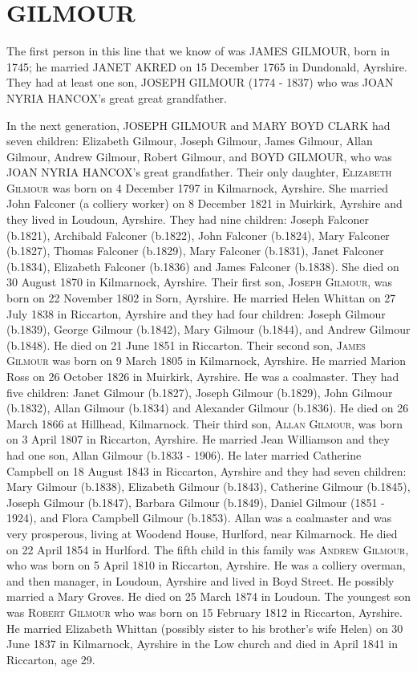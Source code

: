\section{GILMOUR}

The first person in this line that we know of was \uppercase{James Gilmour}, born in 1745;  he married \uppercase{Janet Akred} on 15 December 1765 in Dundonald, Ayrshire. They had at least one son, \uppercase{Joseph Gilmour} (1774 - 1837) who was \uppercase{Joan Nyria Hancox}'s great great grandfather.

In the next generation, \uppercase{Joseph Gilmour} and \uppercase{Mary Boyd Clark} had seven children: Elizabeth Gilmour, Joseph Gilmour, James Gilmour, Allan Gilmour, Andrew Gilmour, Robert Gilmour, and \uppercase{Boyd Gilmour}, who was \uppercase{Joan Nyria Hancox}'s great grandfather.
Their only daughter, \textsc{Elizabeth Gilmour} was born on 4 December 1797 in Kilmarnock, Ayrshire. She married John Falconer (a colliery worker) on 8 December 1821 in Muirkirk, Ayrshire and they lived in Loudoun, Ayrshire. They had nine children: Joseph Falconer (b.1821), Archibald Falconer (b.1822), John Falconer (b.1824), Mary Falconer (b.1827), Thomas Falconer (b.1829), Mary Falconer (b.1831), Janet Falconer (b.1834), Elizabeth Falconer (b.1836) and James Falconer (b.1838).  She died on 30 August 1870 in Kilmarnock, Ayrshire.
Their first son, \textsc{Joseph Gilmour}, was born on 22 November 1802 in Sorn,	Ayrshire.  He married Helen Whittan on 27 July 1838 in Riccarton, Ayrshire and they had four children: Joseph Gilmour (b.1839),  George Gilmour (b.1842), Mary Gilmour (b.1844), and Andrew Gilmour (b.1848). He died on	21 June 1851 in Riccarton.	
Their second son, \textsc{James Gilmour} was born on 9 March 1805 in Kilmarnock, Ayrshire. He married Marion Ross on 26 October 1826 in Muirkirk, Ayrshire. He was a coalmaster. They had five children: Janet Gilmour (b.1827), Joseph Gilmour (b.1829), John Gilmour (b.1832), Allan Gilmour (b.1834) and Alexander Gilmour (b.1836). He died on 26 March 1866 at Hillhead, Kilmarnock.
Their third son, \textsc{Allan Gilmour}, was born on 3 April 1807 in Riccarton, Ayrshire. He married Jean Williamson and they had one son, Allan Gilmour (b.1833 - 1906).  He later married Catherine Campbell on 18 August 1843 in Riccarton, Ayrshire and they had seven children: Mary Gilmour (b.1838), Elizabeth Gilmour (b.1843), Catherine Gilmour (b.1845), Joseph Gilmour (b.1847), Barbara Gilmour (b.1849), Daniel Gilmour (1851 - 1924), and Flora Campbell Gilmour (b.1853).  Allan was a coalmaster and was very prosperous, living at Woodend House, Hurlford, near Kilmarnock.  He died on 22 April 1854 in Hurlford.
The fifth child in this family was \textsc{Andrew Gilmour}, who was born on 5 April 1810 in Riccarton, Ayrshire. He was a colliery overman, and then manager, in Loudoun, Ayrshire and lived in Boyd Street. He possibly married a Mary Groves.  He died 
on 25 March 1874 in Loudoun.
The youngest son was \textsc{Robert Gilmour}  who was born on 15 February 1812 in Riccarton, Ayrshire. He married Elizabeth Whittan (possibly sister to his brother's wife Helen) on 30 June 1837 in Kilmarnock, Ayrshire in the Low church and died in April 1841 in Riccarton, age 29.

